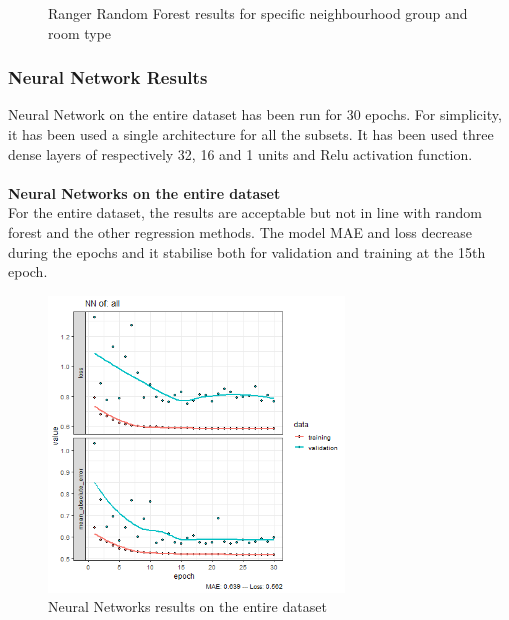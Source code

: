 \documentclass{FR16}
\begin{document}
\begin{figure}[!htb]
\begin{minipage}{0.48\textwidth}
   \end{minipage}
        \caption{Ranger Random Forest results for specific neighbourhood group and room type}\label{fig:18}

\end{figure}





\newpage
\subsubsection{Neural Network Results}
 Neural Network on the entire dataset has been run for 30 epochs. For simplicity, it has been used a single architecture for all the subsets. It has been used three dense layers of respectively 32, 16 and 1 units and Relu activation function.\\\\
\textbf{Neural Networks on the entire dataset }\\
\noindent
For the entire dataset, the results are acceptable but not in line with random forest and the other regression methods. The model MAE and loss decrease during the epochs and it stabilise both for validation and training at the 15th epoch.
\begin{figure}[h]
\centering
\includegraphics[width=0.7\textwidth]{figures/NN-all.PNG} 
 \caption{\label{fig:19} Neural Networks results on the entire dataset}
\end{figure}
\end{document}
